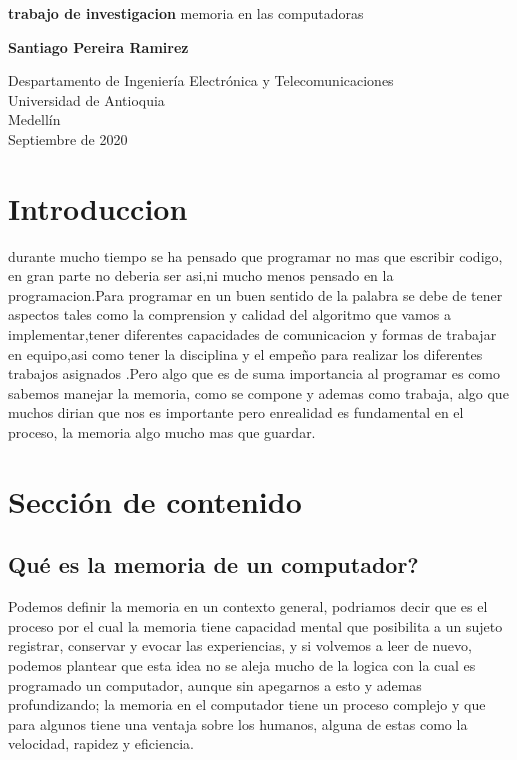 \documentclass{article}
\begin{document}
\begin{titlepage}
    \begin{center}
        \vspace*{1cm}
            
        \Huge
        \textbf{trabajo de investigacion}
        \vspace{0.5cm}
        \LARGE
        memoria en las computadoras
            
        \vspace{1.5cm}
            
        \textbf{Santiago Pereira Ramirez}
            
        \vfill
            
        \vspace{0.8cm}
            
        \Large
        Despartamento de Ingeniería Electrónica y Telecomunicaciones\\
        Universidad de Antioquia\\
        Medellín\\
        Septiembre de 2020
            
    \end{center}
\end{titlepage}

\tableofcontents

\section{Introduccion}
durante mucho tiempo se ha pensado que programar no mas que  escribir codigo, en gran parte no deberia ser asi,ni mucho menos pensado en la programacion.Para programar en un buen sentido de la palabra se debe de tener aspectos tales como la comprension y calidad del algoritmo que vamos a implementar,tener diferentes capacidades de comunicacion 
y formas de trabajar en equipo,asi como tener la disciplina y el empeño para realizar los diferentes trabajos asignados .Pero algo que es de suma importancia al programar es como sabemos manejar la memoria, como se compone y ademas como trabaja, algo que muchos dirian que nos es importante pero enrealidad es fundamental en el proceso, la memoria algo mucho mas que guardar.


\section{Sección de contenido} \label{contenido}
    \subsection{Qué es la memoria de un computador?}
    Podemos definir la memoria en un contexto general, podriamos decir que es el proceso por el cual la memoria tiene capacidad mental que posibilita a un sujeto registrar, conservar y evocar las experiencias\cite{hipocampo}, y si volvemos a leer de nuevo, podemos plantear que esta idea no se aleja mucho de la logica con la cual es programado un computador, aunque sin apegarnos a esto y ademas profundizando; la memoria en el computador tiene un proceso complejo y que para algunos tiene una ventaja sobre los humanos, alguna de estas como la velocidad, rapidez y eficiencia.
    
\end{document}
